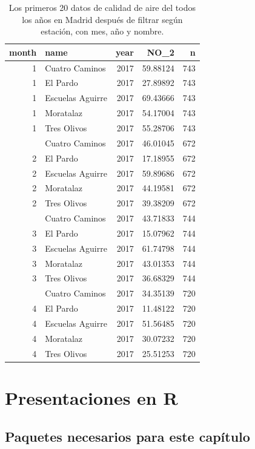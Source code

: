 \documentclass[]{book}
\begin{document}
\begin{table}

\caption{\label{tab:Madrid2017e}Los primeros 20 datos de calidad de aire del todos los años en Madrid después de filtrar según estación, con mes, año y nombre.}
\centering
\begin{tabular}[t]{rlrrr}
\toprule
month & name & year & NO\_2 & n\\
\midrule
1 & Cuatro Caminos & 2017 & 59.88124 & 743\\
1 & El Pardo & 2017 & 27.89892 & 743\\
1 & Escuelas Aguirre & 2017 & 69.43666 & 743\\
1 & Moratalaz & 2017 & 54.17004 & 743\\
1 & Tres Olivos & 2017 & 55.28706 & 743\\
\addlinespace
2 & Cuatro Caminos & 2017 & 46.01045 & 672\\
2 & El Pardo & 2017 & 17.18955 & 672\\
2 & Escuelas Aguirre & 2017 & 59.89686 & 672\\
2 & Moratalaz & 2017 & 44.19581 & 672\\
2 & Tres Olivos & 2017 & 39.38209 & 672\\
\addlinespace
3 & Cuatro Caminos & 2017 & 43.71833 & 744\\
3 & El Pardo & 2017 & 15.07962 & 744\\
3 & Escuelas Aguirre & 2017 & 61.74798 & 744\\
3 & Moratalaz & 2017 & 43.01353 & 744\\
3 & Tres Olivos & 2017 & 36.68329 & 744\\
\addlinespace
4 & Cuatro Caminos & 2017 & 34.35139 & 720\\
4 & El Pardo & 2017 & 11.48122 & 720\\
4 & Escuelas Aguirre & 2017 & 51.56485 & 720\\
4 & Moratalaz & 2017 & 30.07232 & 720\\
4 & Tres Olivos & 2017 & 25.51253 & 720\\
\bottomrule
\end{tabular}
\end{table}

\hypertarget{presentacion}{%
\chapter{Presentaciones en R}\label{presentacion}}

\hypertarget{paquetes-necesarios-para-este-capitulo-6}{%
\section{Paquetes necesarios para este
capítulo}\label{paquetes-necesarios-para-este-capitulo-6}}
\end{document}
